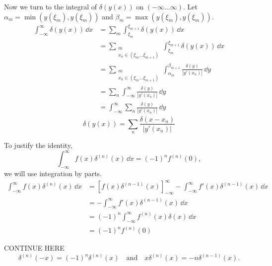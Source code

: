 {\begin{Solution}
  Now we turn to the integral of $\delta(y(x))$ on $(-\infty \ldots \infty)$.
  Let $\alpha_m = \min(y(\xi_m),y(\xi_m))$ and $\beta_m = \max(y(\xi_m),y(\xi_m))$.
  \begin{align*}
    \int_{-\infty}^\infty \delta(y(x))\,\dd x
    &= \sum_m \int_{\xi_m}^{\xi_{m+1}} \delta(y(x))\,\dd x
    \\
    &= \sum_{\substack{m\\x_n \in (\xi_m \ldots \xi_{m+1})}} \int_{\xi_m}^{\xi_{m+1}} \delta(y(x))\,\dd x
    \\
    &= \sum_{\substack{m\\x_n \in (\xi_m \ldots \xi_{m+1})}} 
    \int_{\alpha_m}^{\beta_{m+1}} \frac{\delta(y)}{|y'(x_n)|}\,\dd y
    \\
    &= \sum_n \int_{-\infty}^\infty \frac{\delta(y)}{|y'(x_n)|}\,\dd y
    \\
    &= \int_{-\infty}^\infty \sum_n \frac{\delta(y)}{|y'(x_n)|}\,\dd y
  \end{align*}
  \[
  \boxed{
    \delta(y(x)) = \sum_n \frac{\delta(x - x_n)}{|y'(x_n)|}
    }
  \]
\end{Solution}






\begin{Solution}
  \label{solution ode dirac dnx}
  To justify the identity,
  \[
  \int_{-\infty}^\infty f(x) \delta^{(n)}(x) \,\dd x = (-1)^n f^{(n)}(0),
  \]
  we will use integration by parts.
  \begin{align*}
    \int_{-\infty}^\infty f(x) \delta^{(n)}(x) \,\dd x
    &= \left[ f(x) \delta^{(n-1)}(x) \right]_{-\infty}^\infty - \int_{-\infty}^\infty f'(x) \delta^{(n-1)}(x) \,\dd x
    \\
    &= - \int_{-\infty}^\infty f'(x) \delta^{(n-1)}(x) \,\dd x
    \\
    &= (-1)^n \int_{-\infty}^\infty f^{(n)}(x) \delta(x) \,\dd x
    \\
    &= (-1)^n f^{(n)}(0)
  \end{align*}

  CONTINUE HERE
  \[
  \delta^{(n)}(-x) = (-1)^n \delta^{(n)}(x)
  \quad \mathrm{and} \quad
  x \delta^{(n)}(x) = - n \delta^{(n-1)}(x).
  \]
\end{Solution}








}
